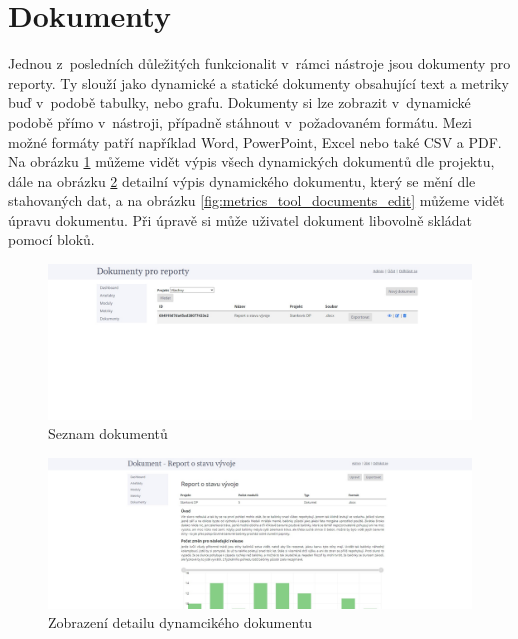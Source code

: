 \documentclass[czech,master]{diploma}
\begin{document}
\section{Dokumenty}
Jednou z~posledních důležitých funkcionalit v~rámci nástroje jsou dokumenty pro reporty. Ty slouží jako dynamické a statické dokumenty obsahující text a metriky buď v~podobě tabulky, nebo grafu. Dokumenty si lze zobrazit v~dynamické podobě přímo v~nástroji, případně stáhnout v~požadovaném formátu. Mezi možné formáty patří například Word, PowerPoint, Excel nebo také CSV a PDF. Na obrázku \ref{fig:metrics_tool_documents} můžeme vidět výpis všech dynamických dokumentů dle projektu, dále na obrázku \ref{fig:metrics_tool_documents_detail} detailní výpis dynamického dokumentu, který se mění dle stahovaných dat, a na obrázku \ref{fig:metrics_tool_documents_edit} můžeme vidět úpravu dokumentu. Při úpravě si může uživatel dokument libovolně skládat pomocí bloků. 

\begin{figure}[!ht]
    \centering
    \includegraphics[width=1\textwidth]{Diplomka/Figures/metrics_tool/documents.jpg}
    \caption{Seznam dokumentů}
    \label{fig:metrics_tool_documents}
\end{figure}

\begin{figure}[!ht]
    \centering
    \includegraphics[width=1\textwidth]{Diplomka/Figures/metrics_tool/documents_detail.jpg}
    \caption{Zobrazení detailu dynamcikého dokumentu}
    \label{fig:metrics_tool_documents_detail}
\end{figure}
\end{document}
